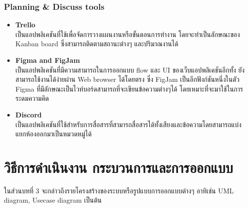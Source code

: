 \documentclass[12pt,oneside,openright,a4paper]{cpe-thai-project}
\begin{document}
\subsection{Planning \& Discuss tools}
\begin{itemize}
\item \textbf{Trello} \\
\hspace*{1cm} เป็นแอปพลิเคชันที่ใช้เพื่อจัดการวางแผนงานหรือขั้นตอนการทำงาน โดยจะทำเป็นลักษณะของ Kanban board ซึ่งสามารถติดตามสถานะต่างๆ และปริมาณงานได้
\item \textbf{Figma and FigJam} \\
\hspace*{1cm} เป็นแอปพลิเคชันที่มีความสามารถในการออกแบบ flow และ UI ของเว็บแอปพลิเคชันอีกทั้ง ยังสามารถใช้งานได้ง่ายผ่าน Web browser ได้โดยตรง ซึ่ง FigJam เป็นอีกฟังก์ชันหนึ่งในตัว Figma ที่มีลักษณะเป็นไวท์บอร์ดสามารถที่จะเขียนข้อความต่างๆได้ โดยเหมาะที่จะมาใช้ในการระดมความคิด
\item \textbf{Discord} \\
\hspace*{1cm} เป็นแอปพลิเคชันที่ใช้สำหรับการสื่อสารที่สามารถสื่อสารได้ทั้งเสียงและข้อความโดยสามารถแบ่งแยกห้องออกมาเป็นหมวดหมู่ได้
\end{itemize}



\chapter{วิธีการดำเนินงาน กระบวนการและการออกแบบ}

ในส่วนบทที่ 3 จะกล่าวถึงรายโครงสร้างของระบบหรือรูปแบบการออกแบบต่างๆ อาทิเช่น UML diagram, Usecase diagram เป็นต้น
\end{document}
